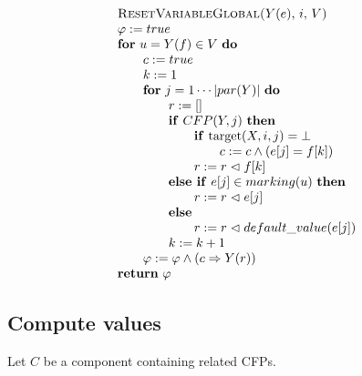 \begin{equation*}
\begin{tabular}{l}
\textsc{ResetVariableGlobal(}$Y(e)$, $i,$ $V$\textsc{)} \\ 
$\varphi :=true$ \\ 
\textbf{for} $u=Y(f)\in V$ \textbf{do} \\ 
$\qquad c:=true$ \\ 
$\qquad k:=1$ \\ 
$\qquad $\textbf{for} $j=1\cdots \left\vert par(Y)\right\vert $ \textbf{do}
\\ 
$\qquad \qquad r:=[]$ \\ 
$\qquad \qquad $\textbf{if} $CFP(Y,j)$ \textbf{then} \\ 
$\qquad \qquad \qquad $\textbf{if} $\mathrm{target}(X,i,j)=\bot $ \\ 
$\qquad \qquad \qquad \qquad c:=c\wedge (e[j]=f[k])$ \\ 
$\qquad \qquad \qquad r:=r\vartriangleleft f[k]$ \\ 
$\qquad \qquad $\textbf{else if} $e[j]\in marking(u)$ \textbf{then} \\ 
$\qquad \qquad \qquad r:=r\vartriangleleft e[j]$ \\ 
$\qquad \qquad $\textbf{else} \\ 
$\qquad \qquad \qquad r:=r\vartriangleleft default\_value(e[j])$ \\ 
$\qquad \qquad k:=k+1$ \\ 
$\qquad \varphi :=\varphi \wedge (c\Rightarrow Y(r))$ \\ 
\textbf{return} $\varphi $%
\end{tabular}%
\end{equation*}

\newpage

\subsection{Compute values}

Let $C$ be a component containing related CFPs.

